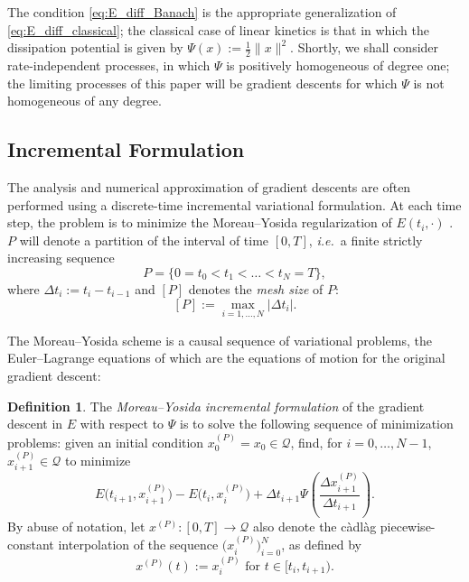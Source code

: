 \documentclass[reqno]{amsart}
\theoremstyle{definition}
\newtheorem{definition}[theorem]{Definition}
\begin{document}
The condition \eqref{eq:E_diff_Banach} is the appropriate generalization of \eqref{eq:E_diff_classical};  the classical case of linear kinetics is that in which the dissipation potential is given by $\Psi(x) := \frac{1}{2} \| x \|^{2}$.  Shortly, we shall consider rate-independent processes, in which $\Psi$ is positively homogeneous of degree one;  the limiting processes of this paper will be gradient descents for which $\Psi$ is not homogeneous of any degree.

\subsection{Incremental Formulation}

The analysis and numerical approximation of gradient descents are often performed using a discrete-time incremental variational formulation.  At each time step, the problem is to minimize the Moreau--Yosida regularization of $E(t_{i}, \cdot)$ \cite{Moreau:1965, Yosida:1965}.  $P$ will denote a partition of the interval of time $[0, T]$, \emph{i.e.}\ a finite strictly increasing sequence
\begin{equation}
	\label{eq:partition}
	P = \{ 0 = t_{0} < t_{1} < \dots < t_{N} = T \},
\end{equation}
where $\Delta t_{i} := t_{i} - t_{i - 1}$ and $[P]$ denotes the \emph{mesh size} of $P$:
\begin{equation}
	\label{eq:mesh}
	[P] := \max_{i = 1, \dots, N} | \Delta t_{i} |.
\end{equation}

The Moreau--Yosida scheme is a causal sequence of variational problems, the Euler--Lagrange equations of which are the equations of motion for the original gradient descent:

\begin{definition}
	\label{defn:MoreauYosida}
	The \emph{Moreau--Yosida incremental formulation} of the gradient descent in $E$ with respect to $\Psi$ is to solve the following sequence of minimization problems:  given an initial condition $x_{0}^{(P)} = x_{0} \in \mathcal{Q}$, find, for $i = 0, \ldots, N - 1$, $x_{i + 1}^{(P)} \in \mathcal{Q}$ to minimize
	\begin{equation}
		\label{eq:MoreauYosida}
		E \big( t_{i + 1}, x_{i + 1}^{(P)} \big) - E \big( t_{i}, x_{i}^{(P)} \big) + \Delta t_{i + 1} \Psi \left( \frac{\Delta x_{i + 1}^{(P)}}{\Delta t_{i + 1}} \right).
	\end{equation}
	By abuse of notation, let $x^{(P)} \colon [0, T] \to \mathcal{Q}$ also denote the c\`{a}dl\`{a}g piecewise-constant interpolation of the sequence $\big( x_{i}^{(P)} \big)_{i = 0}^{N}$, as defined by
	\begin{equation}
		\label{eq:cadlag_interpolation}
		x^{(P)}(t) := x_{i}^{(P)} \text{ for } t \in [t_{i}, t_{i + 1}).
	\end{equation}
\end{definition}
\end{document}
